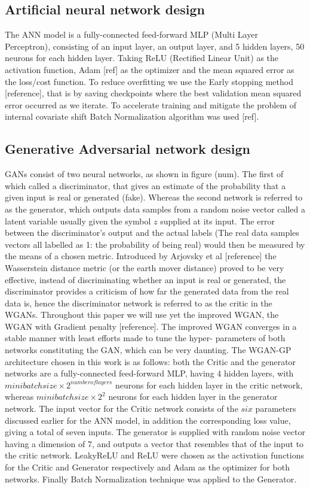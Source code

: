 \documentclass[draft, a4, 10pt, onecolumn]{IEEEtran}
\begin{document}
\subsection{Artificial neural network design}
\label{ssec:ann}
The ANN model is a fully-connected feed-forward MLP (Multi Layer Perceptron), consisting of an input layer, an output layer, and 5 hidden layers, 50 neurons for each hidden layer. Taking ReLU (Rectified Linear Unit) as the activation function, Adam [ref] as the optimizer and the mean squared error as the loss/cost function. To reduce overfitting we use the Early stopping method [reference], that is by saving checkpoints where the best validation mean squared error occurred as we iterate. To accelerate training and mitigate the problem of internal covariate shift Batch Normalization algorithm was used [ref].

\subsection{Generative Adversarial network design}
\label{ssec:gan}

GANs consist of two neural networks, as shown in figure (num). The first of which called a discriminator, that gives an estimate of the probability that a given input is real or generated (fake). Whereas the second network is referred to as the generator, which outputs data samples from a random noise vector called a latent variable usually given the symbol $z$ supplied at its input. The error between the discriminator's output and the actual labels (The real data samples vectors all labelled as 1: the probability of being real) would then be measured by the means of a chosen metric. Introduced by Arjovsky et al [reference] the Wasserstein distance metric (or the earth mover distance) proved to be very effective, instead of discriminating whether an input is real or generated, the discriminator provides a criticism of how far the generated data from the real data is, hence the discriminator network is referred to as the critic in the WGANs. Throughout this paper we will use yet the improved WGAN, the WGAN with Gradient penalty [reference]. The improved WGAN converges in a stable manner with least efforts made to tune the hyper- parameters of both networks constituting the GAN, which can be very daunting.
The WGAN-GP architecture chosen in this work is as follows: both the Critic and the generator networks are a fully-connected feed-forward MLP, having 4 hidden layers, with $ minibatchsize\times2^{number of layers} $ neurons for each hidden layer in the critic network, whereas $ minibatchsize\times2^{2} $ neurons for each hidden layer in the generator network. The input vector for the Critic network consists of the $six$ parameters discussed earlier for the ANN model, in addition the corresponding loss value, giving a total of seven inputs. The generator is supplied with random noise vector having a dimension of $7$, and outputs a vector that resembles that of the input to the critic network. LeakyReLU and ReLU were chosen as the activation functions for the Critic and Generator respectively and Adam as the optimizer for both networks. Finally Batch Normalization technique was applied to the Generator.
\newpage
\end{document}
